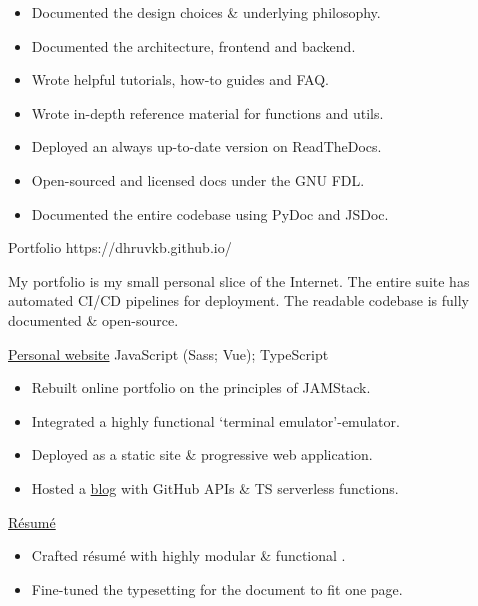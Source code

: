 \begin{sectiondescription}
  \begin{itemize}[nosep, leftmargin = *]
    \item Documented the design choices \& underlying philosophy.
    \item Documented the architecture, frontend and backend.
    \item Wrote helpful tutorials, how-to guides and FAQ.
    \item Wrote in-depth reference material for functions and utils.
    \item Deployed an always up-to-date version on ReadTheDocs.
    \item Open-sourced and licensed docs under the GNU FDL.
    \item Documented the entire codebase using PyDoc and JSDoc.
  \end{itemize}
\end{sectiondescription}


\projectsubsection
  {Portfolio}
  {}
  {https://dhruvkb.github.io/}

\begin{sectiondescription}
  My portfolio is my small personal slice of the Internet. The entire suite has
  automated CI/CD pipelines for deployment. The readable codebase is fully
  documented \& open-source.
\end{sectiondescription}

\projectsubsubsection
  {\href{https://github.com/dhruvkb/portfolio/}{Personal website}}
  {JavaScript (Sass; Vue); TypeScript}

\begin{sectiondescription}
  \begin{itemize}[nosep, leftmargin = *]
    \item Rebuilt online portfolio on the principles of JAMStack.
    \item Integrated a highly functional `terminal emulator'-emulator.
    \item Deployed as a static site \& progressive web application.
    \item Hosted a \href{https://dhruvkb.github.io/#/blog}{blog} with GitHub APIs \& TS serverless functions.
  \end{itemize}
\end{sectiondescription}

\projectsubsubsection
  {\href{https://github.com/dhruvkb/resume/}{Résumé}}
  {\prettylatex}

\begin{sectiondescription}
  \begin{itemize}[nosep, leftmargin = *]
    \item Crafted résumé with highly modular \& functional \prettylatex{}.
    \item Fine-tuned the typesetting for the document to fit one page.
  \end{itemize}
\end{sectiondescription}